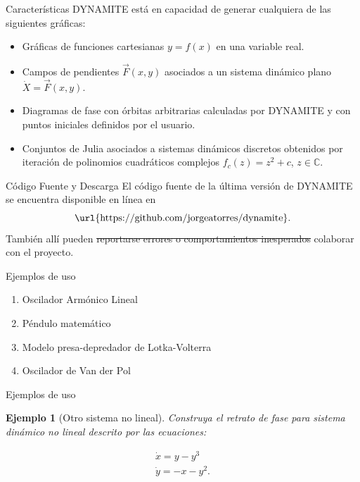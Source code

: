 \documentclass{beamer}
\newtheorem{exa}{Ejemplo}
\renewenvironment{example}{\begin{exa}}{\end{exa}}
\newcommand{\C}{{\ensuremath{\mathbb{C}}}}
\begin{document}
\begin{frame}{Características}
	DYNAMITE está en capacidad de generar cualquiera de las siguientes gráficas:
	
	\begin{itemize}
		\pause
		\item Gráficas de funciones cartesianas $y = f(x)$ en una variable real.
		\pause
		\item Campos de pendientes $\vec{F}(x,y)$ asociados a un sistema dinámico plano $\dot{X} = \vec{F}(x,y)$.
		\pause
		\item Diagramas de fase con órbitas arbitrarias calculadas por DYNAMITE y con puntos iniciales definidos por el usuario.
		\pause
		\item Conjuntos de Julia asociados a sistemas dinámicos discretos obtenidos por iteración de polinomios cuadráticos complejos $f_c(z) = z^2 + c$, $z \in \C$.
	\end{itemize}
\end{frame}

\begin{frame}{Código Fuente y Descarga}
El código fuente de la última versión de DYNAMITE se encuentra disponible en línea en
$$ \text{\url{https://github.com/jorgeatorres/dynamite}}. $$
\pause
También allí pueden \sout{reportarse errores o comportamientos inesperados} colaborar con el proyecto.
\end{frame}

\begin{frame}{Ejemplos de uso}
\begin{enumerate}
\pause
\item Oscilador Armónico Lineal
\pause
\item Péndulo matemático
\pause
\item Modelo presa-depredador de Lotka-Volterra
\pause
\item Oscilador de Van der Pol
\end{enumerate}
\end{frame}

\begin{frame}{Ejemplos de uso}
\begin{example}[Otro sistema no lineal]
Construya el retrato de fase para sistema dinámico no lineal descrito por las ecuaciones:

\begin{equation} \label{eq:dynamite-formula1}
	\begin{array}{ll}
		\dot{x} = y - y^3 \\
		\dot{y} = -x - y^2.
	\end{array}
\end{equation}
\end{example}
\end{frame}
\end{document}
